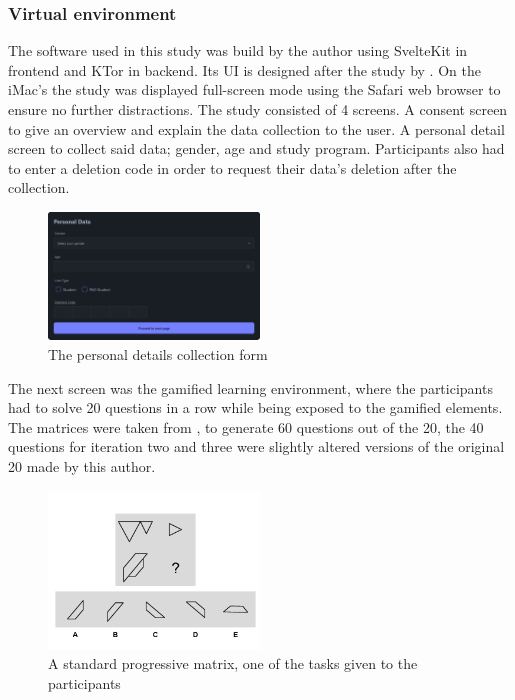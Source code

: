 \subsubsection{Virtual environment}
The software used in this study was build by the author using SvelteKit in frontend and KTor in backend. Its UI is designed after the study by \textcite{albuquerqueDoesGenderStereotype2017}.
On the iMac's the study was displayed full-screen mode using the Safari web browser to ensure no further distractions. The study consisted of 4 screens.
A consent screen to give an overview and explain the data collection to the user.
A personal detail screen to collect said data; gender, age and study program. Participants also had to enter a deletion code in order to request their data's deletion after the collection.
\begin{figure}[H]
  \centering
  \includegraphics[width=0.5\textwidth]{img/details.png}
  \caption{The personal details collection form}
  \label{fig:figureDetails}
\end{figure}
The next screen was the gamified learning environment, where the participants had to solve 20 questions in a row while being exposed to the gamified elements.
The matrices were taken from \textcite{albuquerqueDoesGenderStereotype2017}, to generate 60 questions out of the 20, the 40 questions for iteration two and three were slightly altered versions of the original 20 made by this author.
\begin{figure}[H]
  \centering
  \includegraphics[width=0.5\textwidth]{img/q-17.png}
  \caption{A standard progressive matrix, one of the tasks given to the participants}
  \label{fig:figureMatrix}
\end{figure}
